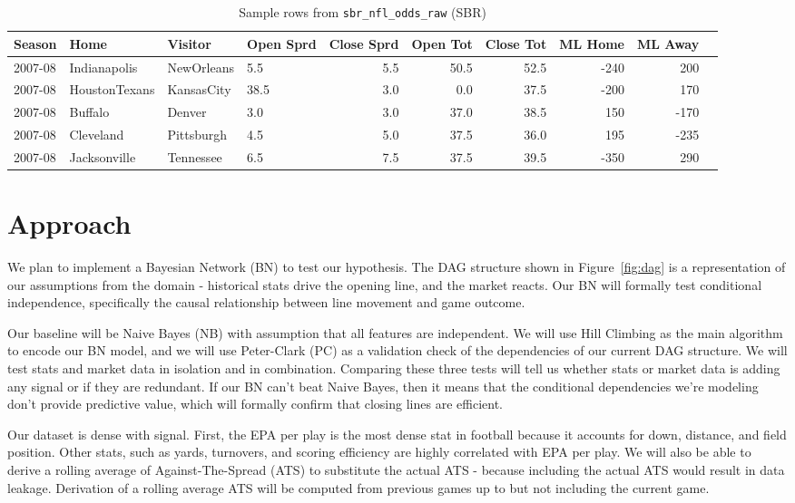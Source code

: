 \documentclass[letterpaper]{article}
\begin{document}
\begin{table}[ht]
	\centering
	\small
	\caption{Sample rows from \texttt{sbr\_nfl\_odds\_raw} (SBR)}
	\begin{tabular}{llllrrrrrr}
		\hline
		\textbf{Season} & \textbf{Home} & \textbf{Visitor} & \textbf{Open Sprd} & \textbf{Close Sprd} & \textbf{Open Tot} & \textbf{Close Tot} & \textbf{ML Home} & \textbf{ML Away} \\
		\hline
		2007-08 & Indianapolis   & NewOrleans  &  5.5 &  5.5 & 50.5 & 52.5 & -240 &  200 \\
		2007-08 & HoustonTexans  & KansasCity  & 38.5 &  3.0 &  0.0 & 37.5 & -200 &  170 \\
		2007-08 & Buffalo        & Denver      &  3.0 &  3.0 & 37.0 & 38.5 &  150 & -170 \\
		2007-08 & Cleveland      & Pittsburgh  &  4.5 &  5.0 & 37.5 & 36.0 &  195 & -235 \\
		2007-08 & Jacksonville   & Tennessee   &  6.5 &  7.5 & 37.5 & 39.5 & -350 &  290 \\
		\hline
	\end{tabular}
	\label{tab:sbr}
\end{table}

\section{Approach}

We plan to implement a Bayesian Network (BN) to test our hypothesis. The DAG structure shown in Figure~\ref{fig:dag} is a representation of our assumptions from the domain - historical stats drive the opening line, and the market reacts. Our BN will formally test conditional independence, specifically the causal relationship between line movement and game outcome. 

Our baseline will be Naive Bayes (NB) with assumption that all features are independent. We will use Hill Climbing as the main algorithm to encode our BN model, and we will use Peter-Clark (PC) as a validation check of the dependencies of our current DAG structure. We will test stats and market data in isolation and in combination. Comparing these three tests will tell us whether stats or market data is adding any signal or if they are redundant. If our BN can't beat Naive Bayes, then it means that the conditional dependencies  we're modeling don't provide predictive value, which will formally confirm that closing lines are efficient. 

Our dataset is dense with signal. First, the EPA per play is the most dense stat in football because it accounts for down, distance, and field position. Other stats, such as yards, turnovers, and scoring efficiency are highly correlated with EPA per play. We will also be able to derive a rolling average of Against-The-Spread (ATS) to substitute the actual ATS - because including the actual ATS would result in data leakage. Derivation of a rolling average ATS will be computed from previous games up to but not including the current game.
\end{document}
